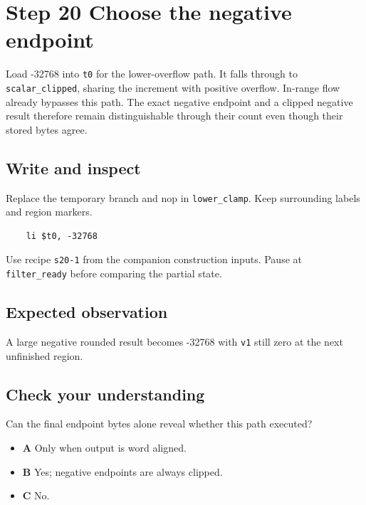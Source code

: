 \section{Step 20 Choose the negative endpoint}\label{fir-s20}

Load -32768 into \texttt{t0} for the lower-overflow path. It falls through to \texttt{scalar\_clipped}, sharing the increment with positive overflow. In-range flow already bypasses this path. The exact negative endpoint and a clipped negative result therefore remain distinguishable through their count even though their stored bytes agree.

\subsection{Write and inspect}
Replace the temporary branch and nop in \texttt{lower\_clamp}. Keep surrounding labels and region markers.

\begin{verbatim}
    li $t0, -32768
\end{verbatim}
Use recipe \texttt{s20-1} from the companion construction inputs. Pause at \texttt{filter\_ready} before comparing the partial state.

\subsection{Expected observation}
A large negative rounded result becomes -32768 with \texttt{v1} still zero at the next unfinished region.

\subsection{Check your understanding}
Can the final endpoint bytes alone reveal whether this path executed?

\begin{itemize}
  \item \textbf{A} Only when output is word aligned.
  \item \textbf{B} Yes; negative endpoints are always clipped.
  \item \textbf{C} No.
\end{itemize}
